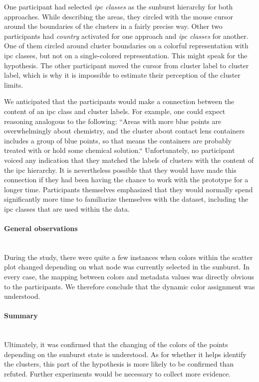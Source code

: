 One participant had selected \textit{\gls{ipc} classes} as the sunburst hierarchy for both approaches.
While describing the areas, they circled with the mouse cursor around the boundaries of the clusters in a fairly precise way.
Other two participants had \textit{country} activated for one approach and \textit{\gls{ipc} classes} for another.
One of them circled around cluster boundaries on a colorful representation with \gls{ipc} classes, but not on a single-colored representation.
This might speak for the hypothesis.
The other participant moved the cursor from cluster label to cluster label, which is why it is impossible to estimate their perception of the cluster limits.

We anticipated that the participants would make a connection between the content of an \gls{ipc} class and cluster labels.
For example, one could expect reasoning analogous to the following: ``Areas with more blue points are overwhelmingly about chemistry, and the cluster about contact lens containers includes a group of blue points, so that means the containers  are probably treated with or hold some chemical solution.``
Unfortunately, no participant voiced any indication that they matched the labels of clusters with the content of the \gls{ipc} hierarchy.
It is nevertheless possible that they would have made this connection if they had been having the chance to work with the prototype for a longer time.
Participants themselves emphasized that they would normally spend significantly more time to familiarize themselves with the dataset, including the \gls{ipc} classes that are used within the data.

\paragraph{General observations}~\\
During the study, there were quite a few instances when colors within the scatter plot changed depending on what node was currently selected in the sunburst.
In every case, the mapping between colors and metadata values was directly obvious to the participants.
We therefore conclude that the dynamic color assignment was understood.

\paragraph{Summary}~\\
Ultimately, it was confirmed that the changing of the colors of the points depending on the sunburst state is understood. 
As for whether it helps identify the clusters, this part of the hypothesis is more likely to be confirmed than refuted.
Further experiments would be necessary to collect more evidence.

